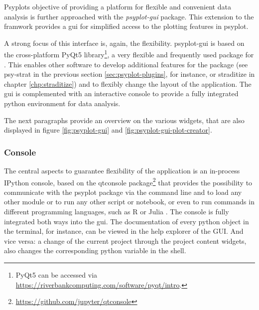 \documentclass[
11pt, %
english, %
singlespacing, %
headsepline, %
]{MastersDoctoralThesis} %
\begin{document}
\begin{NoHyper}
\begin{refsection}
Psyplots objective of providing a platform for flexible and convenient data analysis is further approached with the \textit{psyplot-gui} package. This extension to the framwork provides a \gls{gui} for simplified access to the plotting features in psyplot.

A strong focus of this interface is, again, the flexibility. psyplot-gui is based on the cross-platform PyQt5 library\footnote{PyQt5 can be accessed via \url{https://riverbankcomputing.com/software/pyqt/intro}.}, a very flexible and frequently used package for . This enables other software to develop additional features for the package (see psy-strat in the previous section \ref{sec:psyplot-plugins}, for instance, or straditize in chapter \ref{chp:straditize}) and to flexibly change the layout of the application. The \gls{gui} is complemented with an interactive console to provide a fully integrated python environment for data analysis.

The next paragraphs provide an overview on the various widgets, that are also displayed in figure \ref{fig:psyplot-gui} and \ref{fig:psyplot-gui-plot-creator}. 

\subsubsection{Console}
The central aspects to guarantee flexibility of the application is an in-process IPython console, based on the qtconsole package\footnote{\url{https://github.com/jupyter/qtconsole}} that provides the possibility to communicate with the psyplot package via the command line and to load any other module or to run any other script or notebook, or even to run commands in different programming languages, such as R \citep{RCT2019} or Julia \citep{BezansonEdelmanKarpinskiEtAl2017}. The console is fully integrated both ways into the \gls{gui}. The documentation of every python object in the terminal, for instance, can be viewed in the help explorer of the GUI. And vice versa: a change of the current project through the project content widgets, also changes the corresponding python variable in the shell. 


\end{refsection}
\end{NoHyper}
\end{document}
